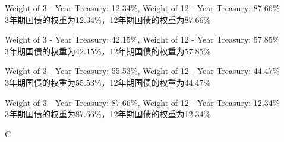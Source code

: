 \documentclass{article}
\begin{document}
        \begin{choices}
            \item Weight of 3 - Year Treasury: 12.34\%, Weight of 12 - Year Treasury: 87.66\%\\
            3年期国债的权重为12.34\%，12年期国债的权重为87.66\%
            \item Weight of 3 - Year Treasury: 42.15\%, Weight of 12 - Year Treasury: 57.85\%\\
            3年期国债的权重为42.15\%，12年期国债的权重为57.85\%
            \item Weight of 3 - Year Treasury: 55.53\%, Weight of 12 - Year Treasury: 44.47\%\\
            3年期国债的权重为55.53\%，12年期国债的权重为44.47\%
            \item Weight of 3 - Year Treasury: 87.66\%, Weight of 12 - Year Treasury: 12.34\%\\
            3年期国债的权重为87.66\%，12年期国债的权重为12.34\%
        \end{choices}
        
        \begin{correctanswer}
            C
        \end{correctanswer}
        
\end{document}
